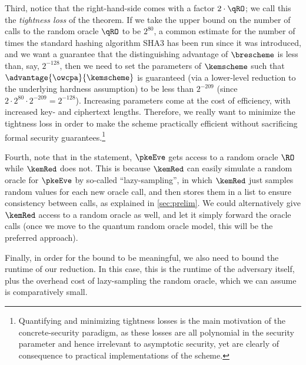      Third, notice that the right-hand-side comes with a factor $2\cdot \qRO$; 
        we call this the \emph{tightness loss} of the theorem. If we take the
        upper bound on the number of calls to the random oracle $\qRO$ to be $2^{80}$,
        a common estimate for the number of times the standard hashing algorithm
        SHA3 has been run since it was introduced, and we want a guarantee that 
        the distinguishing advantage of $\brescheme$ is less than, say,
        $2^{-128}$, then we need to set the parameters of $\kemscheme$ such that
        $\advantage{\owcpa}{\kemscheme}$ is guaranteed (via a lower-level reduction to
        the underlying hardness assumption) to be less than $2^{-209}$ (since
        $2\cdot 2^{80}\cdot 2^{-209} = 2^{-128}$).
        Increasing parameters come at the cost of efficiency, with increased
        key- and ciphertext lengths. Therefore, we really want to minimize the
        tightness loss in order to make the scheme practically efficient without
        sacrificing formal security guarantees.\footnote{
          Quantifying and minimizing tightness losses is the main motivation of the
          concrete-security paradigm, as these losses are all polynomial
          in the security parameter and hence irrelevant to
          asymptotic security, yet are clearly of consequence to practical
          implementations of the scheme.
        }
        
      Fourth, note that in the statement, $\pkeEve$ gets access to a random
        oracle $\RO$ while $\kemRed$ does not. This is because $\kemRed$ can
        easily simulate a random oracle for $\pkeEve$ by so-called
        ``lazy-sampling'', in which $\kemRed$ just samples random values for
        each new oracle call, and then stores them in a list to ensure
        consistency between calls, as explained in \cref{sec:prelim}. 
        We could alternatively give $\kemRed$ access
        to a random oracle as well, and let it simply forward the oracle calls
        (once we move to the quantum random oracle model, this will be the
        preferred approach).

      Finally, in order for the bound to be meaningful, we also need to bound
        the runtime of our reduction. In this case, this is the runtime
        of the adversary itself, plus the overhead cost of lazy-sampling the
        random oracle, which we can assume is comparatively small.

